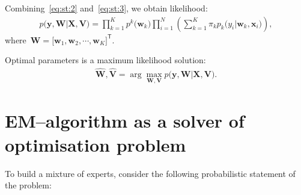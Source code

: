 \documentclass[12pt, twoside]{article}
\begin{document}
Combining~\eqref{eq:st:2} and~\eqref{eq:st:3}, we obtain likelihood:
\[
\label{eq:st:4}
\begin{aligned}
p\bigr(\mathbf{y}, \mathbf{W}|\mathbf{X}, \mathbf{V}\bigr) = \prod_{k=1}^{K}p^{k}\bigr(\mathbf{w}_k\bigr)\prod_{i=1}^{N}\left(\sum_{k=1}^{K}\pi_{k}p_{k}\bigr(y_i|\mathbf{w}_k, \mathbf{x}_i\bigr)\right),
\end{aligned}
\]
where~$\mathbf{W} = \bigr[\mathbf{w}_1, \mathbf{w}_2, \cdots, \mathbf{w}_K\bigr]^{\mathsf{T}}.$

Optimal parameters is a maximum likelihood solution:
\[
\label{eq:st:5}
\begin{aligned}
\hat{\mathbf{W}}, \hat{\mathbf{V}} = \arg\max_{\mathbf{W}, \mathbf{V}} p\bigr(\mathbf{y}, \mathbf{W}|\mathbf{X}, \mathbf{V}\bigr).
\end{aligned}
\]

\section{EM--algorithm as a solver of optimisation problem }
To build a mixture of experts, consider the following probabilistic statement of the problem:
\end{document}

